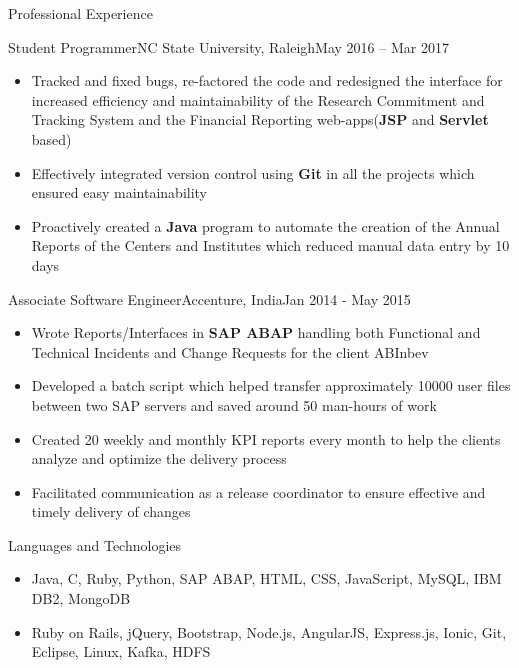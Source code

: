 \documentclass[]{mcdowellcv}
\begin{document}
	\begin{cvsection}{Professional Experience}
		\begin{cvsubsection}{Student Programmer}{NC State University, Raleigh}{May 2016 – Mar 2017}
			\begin{itemize}
            \item Tracked and fixed bugs, re-factored the code and redesigned the interface for increased efficiency and maintainability of the Research Commitment and Tracking System and the Financial Reporting web-apps(\textbf{JSP} and \textbf{Servlet} based)
            \item Effectively integrated version control using \textbf{Git} in all the projects which ensured easy maintainability
			\item Proactively created a \textbf{Java} program to automate the creation of the Annual Reports of the Centers and Institutes which reduced manual data entry by 10 days
			\end{itemize}
		\end{cvsubsection}
		
		\begin{cvsubsection}{Associate Software Engineer}{Accenture, India}{Jan 2014 - May 2015}	
			\begin{itemize}
            	\item Wrote Reports/Interfaces in \textbf{SAP ABAP} handling both Functional and Technical Incidents and Change Requests for the client ABInbev
				\item Developed a batch script which helped transfer approximately 10000 user files between two SAP servers and saved around 50 man-hours  of work
				\item Created 20 weekly and monthly KPI reports every month to help the clients analyze and optimize the delivery process
                \item Facilitated communication as a release coordinator to ensure effective and timely delivery of changes
			\end{itemize}
		\end{cvsubsection}

	\end{cvsection}

\begin{cvsection}{Languages and Technologies}
		\begin{cvsubsection}{}{}{}	
			\begin{itemize}
				\item Java, C, Ruby, Python, SAP ABAP, HTML, CSS, JavaScript, MySQL, IBM DB2, MongoDB
				\item Ruby on Rails, jQuery, Bootstrap, Node.js, AngularJS, Express.js, Ionic, Git, Eclipse, Linux, Kafka, HDFS
			\end{itemize}
		\end{cvsubsection}
	\end{cvsection}
	
\end{document}
